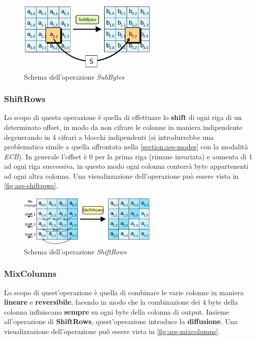 \begin{figure}[h]
    \centering
    \includegraphics[width=0.6\textwidth]{capitoli/figure-crittografia/aes-SubBytes.png}
    \caption{Schema dell'operazione \emph{SubBytes}}
    \label{fig:aes-subbytes}
\end{figure}

\subsubsection{ShiftRows}
Lo scopo di questa operazione è quella di effettuare lo \textbf{shift} di ogni riga di un determinato offset, in modo da non cifrare le colonne in maniera indipendente degenerando in 4 cifrari a blocchi indipendenti (si introdurrebbe una problematica simile a quella affrontata nella \autoref{section:aes-modes} con la modalità \emph{ECB}). In generale l'offset è 0 per la prima riga (rimane invariata) e aumenta di 1 ad ogni riga successiva, in questo modo ogni colonna conterrà byte appartenenti ad ogni altra colonna. Una visualizzazione dell'operazione può essere vista in \autoref{fig:aes-shiftrows}. \cite{wikipedia_aes}

\begin{figure}[h]
    \centering
    \includegraphics[width=0.6\textwidth]{capitoli/figure-crittografia/aes-ShiftRows.png}
    \caption{Schema dell'operazione \emph{ShiftRows}}
    \label{fig:aes-shiftrows}
\end{figure}

\subsubsection{MixColumns}
Lo scopo di quest'operazione è quella di combinare le varie colonne in maniera \textbf{lineare} e \textbf{reversibile}, facendo in modo che la combinazione dei 4 byte della colonna influiscano \textbf{sempre} su ogni byte della colonna di output. Insieme all'operazione di \textbf{ShiftRows}, quest'operazione introduce la \textbf{diffusione}. Una visualizzazione dell'operazione può essere vista in \autoref{fig:aes-mixcolumns}. \cite{wikipedia_aes}

